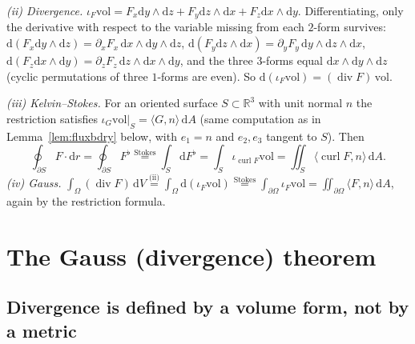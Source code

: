 \documentclass[11pt,a4paper]{article}
\numberwithin{equation}{section}
\theoremstyle{definition}
\theoremstyle{plain}
\newcommand{\R}{\mathbb{R}}
\newcommand{\dd}{\mathrm{d}}
\newcommand{\vol}{\mathrm{vol}}
\begin{document}
\emph{(ii) Divergence.} $\iota_F\vol=F_x\dd y\wedge\dd z+F_y\dd z\wedge\dd x+F_z\dd x\wedge\dd y$. Differentiating, only the derivative with respect to the variable missing from each $2$-form survives:
$\dd(F_x\dd y\wedge\dd z)=\partial_xF_x\,\dd x\wedge\dd y\wedge\dd z$, $\dd(F_y\dd z\wedge\dd x)=\partial_yF_y\,\dd y\wedge\dd z\wedge\dd x$, $\dd(F_z\dd x\wedge\dd y)=\partial_zF_z\,\dd z\wedge\dd x\wedge\dd y$,
and the three $3$-forms equal $\dd x\wedge\dd y\wedge\dd z$ (cyclic permutations of three $1$-forms are even). So $\dd(\iota_F\vol)=(\operatorname{div}F)\,\vol$.

\emph{(iii) Kelvin--Stokes.} For an oriented surface $S\subset\R^3$ with unit normal $n$ the restriction satisfies $\iota_G\vol|_S=\langle G,n\rangle\,\dd A$ (same computation as in Lemma~\ref{lem:fluxbdry} below, with $e_1=n$ and $e_2,e_3$ tangent to $S$). Then
\[
\oint_{\partial S}F\cdot\dd r=\oint_{\partial S}F^\flat\overset{\text{Stokes}}=\int_S\dd F^\flat=\int_S\iota_{\operatorname{curl}F}\vol=\iint_S\langle\operatorname{curl}F,n\rangle\,\dd A .
\]
\emph{(iv) Gauss.} $\displaystyle\int_\Omega(\operatorname{div}F)\,\dd V\overset{\text{(ii)}}=\int_\Omega\dd(\iota_F\vol)\overset{\text{Stokes}}=\int_{\partial\Omega}\iota_F\vol=\iint_{\partial\Omega}\langle F,n\rangle\,\dd A$, again by the restriction formula.

\section{The Gauss (divergence) theorem}\label{sec:gauss}

\subsection{Divergence is defined by a volume form, not by a metric}\label{sec:divmu}
\end{document}
